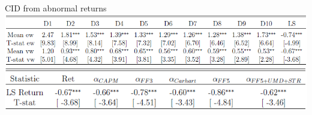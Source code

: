\documentclass{beamer}
\begin{document}
\begin{frame}{CID from abnormal returns}
\includegraphics[width=1\textwidth]{cid_from_abns1.png} \\
\vspace{1cm}
\includegraphics[width=1\textwidth]{cid_from_abns2.png}
\end{frame}
\end{document}
